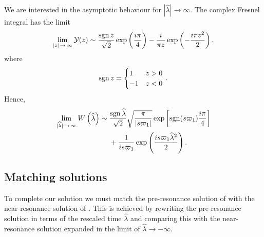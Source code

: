 We are interested in the asymptotic behaviour for $|\widehat{\lambda}| \rightarrow \infty$. The complex Fresnel integral has the limit~\cite{Olver2010} %
\begin{equation}
\lim_{|z|\,\rightarrow\,\infty} \mathcal{Y}(z) \sim \dfrac{\operatorname{sgn} z}{\sqrt{2}} \exp\left(\dfrac{i\pi}{4}\right) - \dfrac{i}{\pi z}\exp\left(-\dfrac{i\pi z^2}{2}\right),
\end{equation}
where 
\begin{equation}
\operatorname{sgn} z = \begin{cases}
1 & z > 0 \\
-1 & z < 0
\end{cases}\,.
\end{equation}
Hence,
\begin{align}
\lim_{|\widehat{\lambda}|\,\rightarrow\,\infty}W\left(\widehat{\lambda}\right) \sim {} & \dfrac{\operatorname{sgn} \widehat{\lambda}}{\sqrt{2}}\sqrt{\dfrac{\pi}{|s\varpi_1|}}\exp\left[\operatorname{sgn}(s\varpi_1)\dfrac{i\pi}{4}\right] \nonumber \\
  {} & + \frac{1}{is\varpi_1}\exp\left(\dfrac{is \varpi_1 \widehat{\lambda}^2}{2}\right).
\label{eq:Fres-limit}
\end{align}

\subsection{Matching solutions}

To complete our solution we must match the pre-resonance solution of  with the near-resonance solution of . This is achieved by rewriting the pre-resonance solution in terms of the rescaled time $\widehat{\lambda}$ and comparing this with the near-resonance solution expanded in the limit of $\widehat{\lambda} \rightarrow -\infty$.

